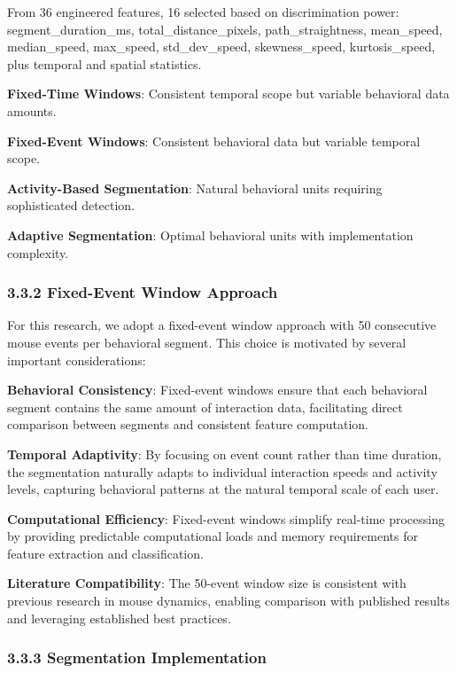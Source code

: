 \documentclass[
  11pt,
  a4paper,
]{article}
\begin{document}
From 36 engineered features, 16 selected based on discrimination power:
segment\_duration\_ms, total\_distance\_pixels, path\_straightness,
mean\_speed, median\_speed, max\_speed, std\_dev\_speed,
skewness\_speed, kurtosis\_speed, plus temporal and spatial statistics.

\textbf{Fixed-Time Windows}: Consistent temporal scope but variable
behavioral data amounts.

\textbf{Fixed-Event Windows}: Consistent behavioral data but variable
temporal scope.

\textbf{Activity-Based Segmentation}: Natural behavioral units requiring
sophisticated detection.

\textbf{Adaptive Segmentation}: Optimal behavioral units with
implementation complexity.

\subsubsection{3.3.2 Fixed-Event Window
Approach}\label{fixed-event-window-approach}

For this research, we adopt a fixed-event window approach with 50
consecutive mouse events per behavioral segment. This choice is
motivated by several important considerations:

\textbf{Behavioral Consistency}: Fixed-event windows ensure that each
behavioral segment contains the same amount of interaction data,
facilitating direct comparison between segments and consistent feature
computation.

\textbf{Temporal Adaptivity}: By focusing on event count rather than
time duration, the segmentation naturally adapts to individual
interaction speeds and activity levels, capturing behavioral patterns at
the natural temporal scale of each user.

\textbf{Computational Efficiency}: Fixed-event windows simplify
real-time processing by providing predictable computational loads and
memory requirements for feature extraction and classification.

\textbf{Literature Compatibility}: The 50-event window size is
consistent with previous research in mouse dynamics, enabling comparison
with published results and leveraging established best practices.

\subsubsection{3.3.3 Segmentation
Implementation}\label{segmentation-implementation}
\end{document}

